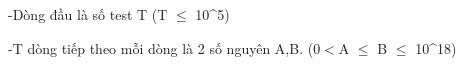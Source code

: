 -Dòng đầu là số test T (T $\le$ 10^5)  

   -T dòng tiếp theo mỗi dòng là 2 số nguyên A,B. (0$<$A $\le$ B $\le$ 10^18)  

\